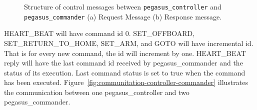 \begin{figure}
	\centering
	\caption[Structure of control messages.]{\small 
		Structure of control messages between \texttt{pegasus\_controller} and \texttt{pegasus\_commander} (a) Request Message (b) Response message.}
	
	\label{fig:control-messages}
\end{figure}

HEART\_BEAT will have command id 0. SET\_OFFBOARD, SET\_RETURN\_TO\_HOME, SET\_ARM, and GOTO will have incremental id. That is for every new command, the id will increment by one. HEART\_BEAT reply will have the last command id received by pegasus\_commander and the status of its execution. Last command status is set to true when the command has been executed. Figure~\ref{fig:communitation-controller-commander} illustrates the communication between one pegasus\_controller and two pegasus\_commander.

